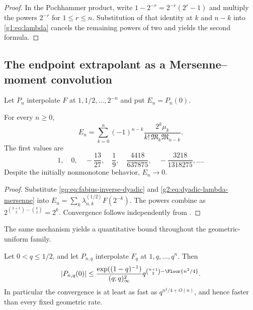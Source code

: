 \begin{proof}
In the Pochhammer product, write
$1-2^{-r}=2^{-r}(2^r-1)$ and multiply the powers $2^{-r}$ for
$1\le r\le n$.  Substitution of that identity at $k$ and $n-k$ into
\eqref{g1:eq:lambda} cancels the remaining powers of two and yields the
second formula.
\end{proof}


\subsection{The endpoint extrapolant as a Mersenne--moment convolution}

Let $P_n$ interpolate $F$ at
$1,1/2,\ldots,2^{-n}$ and put $E_n=P_n(0)$.

\begin{theorem}
\label{g2:thm:fabius-endpoint-convolution}
For every $n\ge0$,
\begin{equation}
 E_n
 =\sum_{k=0}^n(-1)^{n-k}
 \frac{2^k\mu_k}
 {k!\,\mathfrak M_k\mathfrak M_{n-k}}.
 \label{g2:eq:fabius-endpoint-convolution}
\end{equation}
The first values are
\[
 1,\quad 0,\quad -\frac{13}{27},\quad \frac19,\quad
 \frac{4418}{637875},\quad -\frac{3218}{1318275},\ldots.
\]
Despite the initially nonmonotone behavior, $E_n\to0$.
\end{theorem}

\begin{proof}
Substitute \eqref{gq:eq:fabius-inverse-dyadic} and
\eqref{g2:eq:dyadic-lambda-mersenne} into
$E_n=\sum_k\lambda_{n,k}^{(1/2)}F(2^{-k})$.  The powers combine as
$2^{\binom{k+1}{2}-\binom k2}=2^k$.  Convergence follows independently from
.
\end{proof}

The same mechanism yields a quantitative bound throughout the
geometric-uniform family.

\begin{theorem}
\label{g2:thm:quadratic-endpoint-bound}
Let $0<q\le1/2$, and let $P_{n,q}$ interpolate $F_q$ at
$1,q,\ldots,q^n$.  Then
\begin{equation}
 |P_{n,q}(0)|
 \le
 \frac{\exp((1-q)^{-1})}{(q;q)_\infty^2}
 q^{\binom{n+1}{2}-\Floor{n^2/4}}.
 \label{g2:eq:quadratic-endpoint-bound}
\end{equation}
In particular the convergence is at least as fast as
$q^{n^2/4+O(n)}$, and hence faster than every fixed geometric rate.
\end{theorem}


